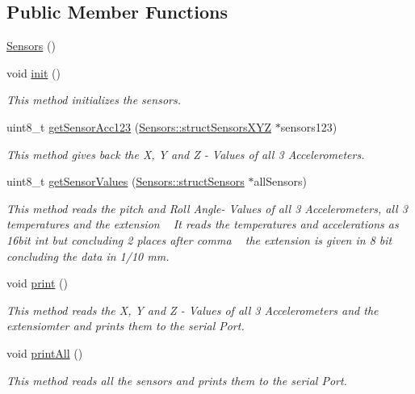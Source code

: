 \subsection*{Public Member Functions}
\begin{DoxyCompactItemize}
\item 
\hyperlink{class_sensors_a68ef7a2ec8dd0ffd9b35b70b50c0ab09}{Sensors} ()
\item 
void \hyperlink{class_sensors_a6dc9f66e4319c82649dc79cfa4e5ead8}{init} ()
\begin{DoxyCompactList}\small\item\em This method initializes the sensors. \end{DoxyCompactList}\item 
uint8\+\_\+t \hyperlink{class_sensors_a8c6d7ac9d485e0f168a5bc3557cdcd88}{get\+Sensor\+Acc123} (\hyperlink{struct_sensors_1_1struct_sensors_x_y_z}{Sensors\+::struct\+Sensors\+X\+YZ} $\ast$sensors123)
\begin{DoxyCompactList}\small\item\em This method gives back the X, Y and Z -\/ Values of all 3 Accelerometers. \end{DoxyCompactList}\item 
uint8\+\_\+t \hyperlink{class_sensors_af4d03d967b555d453920cd44988b81ff}{get\+Sensor\+Values} (\hyperlink{struct_sensors_1_1struct_sensors}{Sensors\+::struct\+Sensors} $\ast$all\+Sensors)
\begin{DoxyCompactList}\small\item\em This method reads the pitch and Roll Angle-\/ Values of all 3 Accelerometers, all 3 temperatures and the extension ~\newline
 It reads the temperatures and accelerations as 16bit int but concluding 2 places after comma ~\newline
 the extension is given in 8 bit concluding the data in 1/10 mm. \end{DoxyCompactList}\item 
void \hyperlink{class_sensors_ad38384b568dac4c2f656a78c28464e9a}{print} ()
\begin{DoxyCompactList}\small\item\em This method reads the X, Y and Z -\/ Values of all 3 Accelerometers and the extensiomter and prints them to the serial Port. \end{DoxyCompactList}\item 
void \hyperlink{class_sensors_ae34f773a3f857f8822a6578c5ba8420c}{print\+All} ()
\begin{DoxyCompactList}\small\item\em This method reads all the sensors and prints them to the serial Port. \end{DoxyCompactList}\item 

\end{DoxyCompactItemize}
